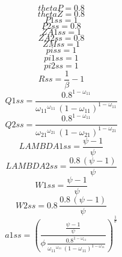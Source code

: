 \begin{dmath*}
thetaP = 0.8
\end{dmath*}
\begin{dmath*}
thetaZ = 0.8
\end{dmath*}
\begin{dmath*}
P1ss = 1
\end{dmath*}
\begin{dmath*}
P2ss = 0.8
\end{dmath*}
\begin{dmath*}
ZA1ss = 1
\end{dmath*}
\begin{dmath*}
ZA2ss = 0.8
\end{dmath*}
\begin{dmath*}
ZMss = 1
\end{dmath*}
\begin{dmath*}
piss = 1
\end{dmath*}
\begin{dmath*}
pi1ss = 1
\end{dmath*}
\begin{dmath*}
pi2ss = 1
\end{dmath*}
\begin{dmath*}
Rss = \frac{1}{{{\beta}}}-1
\end{dmath*}
\begin{dmath*}
Q1ss = \frac{0.8^{1-{{\omega_{11}}}}}{{{\omega_{11}}}^{{{\omega_{11}}}}\, \left(1-{{\omega_{11}}}\right)^{1-{{\omega_{11}}}}}
\end{dmath*}
\begin{dmath*}
Q2ss = \frac{0.8^{1-{{\omega_{11}}}}}{{{\omega_{21}}}^{{{\omega_{21}}}}\, \left(1-{{\omega_{21}}}\right)^{1-{{\omega_{21}}}}}
\end{dmath*}
\begin{dmath*}
LAMBDA1ss = \frac{{{\psi}}-1}{{{\psi}}}
\end{dmath*}
\begin{dmath*}
LAMBDA2ss = \frac{0.8\, \left({{\psi}}-1\right)}{{{\psi}}}
\end{dmath*}
\begin{dmath*}
W1ss = \frac{{{\psi}}-1}{{{\psi}}}
\end{dmath*}
\begin{dmath*}
W2ss = 0.8\, \frac{0.8\, \left({{\psi}}-1\right)}{{{\psi}}}
\end{dmath*}
\begin{dmath*}
a1ss = \left(\frac{\frac{{{\psi}}-1}{{{\psi}}}}{{{\phi}}\, \frac{0.8^{1-{{\omega_{11}}}}}{{{\omega_{11}}}^{{{\omega_{11}}}}\, \left(1-{{\omega_{11}}}\right)^{1-{{\omega_{11}}}}}}\right)^{\frac{1}{{{\sigma}}}}
\end{dmath*}
